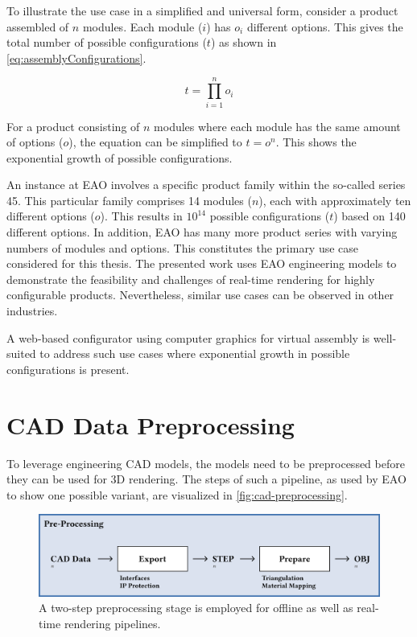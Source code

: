 To illustrate the use case in a simplified and universal form, consider a product assembled of $n$ modules. Each module ($i$) has $o_i$ different options. This gives the total number of possible configurations ($t$) as shown in \autoref{eq:assemblyConfigurations}.

\begin{equation}
  t = \prod_{i=1}^n o_i
  \label{eq:assemblyConfigurations}
\end{equation}

For a product consisting of $n$ modules where each module has the same amount of options ($o$), the equation can be simplified to $t = o^n$. This shows the exponential growth of possible configurations.

An instance at EAO involves a specific product family within the so-called series 45. This particular family comprises 14 modules ($n$), each with approximately ten different options ($o$). This results in $10^{14}$ possible configurations ($t$) based on 140 different options. In addition, EAO has many more product series with varying numbers of modules and options. This constitutes the primary use case considered for this thesis. The presented work uses EAO engineering models to demonstrate the feasibility and challenges of real-time rendering for highly configurable products. Nevertheless, similar use cases can be observed in other industries.

A web-based configurator using computer graphics for virtual assembly is well-suited to address such use cases where exponential growth in possible configurations is present.

\section{CAD Data Preprocessing}

To leverage engineering \gls{CAD} models, the models need to be preprocessed before they can be used for 3D rendering. The steps of such a pipeline, as used by EAO to show one possible variant, are visualized in \autoref{fig:cad-preprocessing}.

\begin{figure}[H]
  \centering
  \includegraphics[width=0.9\columnwidth]{resources/cad-pipeline-preprocessing.png}
  \caption{A two-step preprocessing stage is employed for offline as well as real-time rendering pipelines.}
  \label{fig:cad-preprocessing}
\end{figure}

